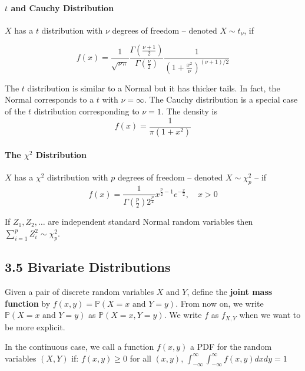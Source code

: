 \paragraph{\texorpdfstring{\(t\) and Cauchy Distribution}{t and Cauchy Distribution}}\label{t-and-cauchy-distribution}

\(X\) has a \(t\) distribution with \(\nu\) degrees of freedom -- denoted \(X \sim t_\nu\), if

\[
f(x) = \frac{1}{\sqrt{\nu \pi}} \frac{\Gamma\left( \frac{\nu + 1}{2} \right)}{\Gamma\left( \frac{\nu}{2} \right)} \frac{1}{\left(1 + \frac{x^{2}}{\nu} \right)^{(\nu + 1) / 2}} 
\]

The \(t\) distribution is similar to a Normal but it has thicker tails. In fact, the Normal corresponds to a \(t\) with \(\nu = \infty\). The Cauchy distribution is a special case of the \(t\) distribution corresponding to \(\nu = 1\). The density is
\[
f(x) = \frac{1}{\pi (1 + x^{2})}
\]

\paragraph{\texorpdfstring{The \(\chi^{2}\) Distribution}{The \textbackslash chi^{2} Distribution}}\label{chi2:dist}

\(X\) has a \(\chi^{2}\) distribution with \(p\) degrees of freedom -- denoted \(X \sim \chi_{p}^{2}\) -- if
\[ 
f(x) = \frac{1}{\Gamma\left(\frac{p}{2}\right) 2^{\frac{p}{2}}} x^{\frac{p}{2} - 1} e^{-\frac{x}{2}}, \quad x > 0 
\]

If \(Z_{1}, Z_{2}, \dots\) are independent standard Normal random variables then \(\sum_{i=1}^p Z_{i}^{2} \sim \chi_{p}^{2}\).

\subsection*{3.5 Bivariate Distributions}\label{bivariate-distributions}

Given a pair of discrete random variables \(X\) and \(Y\), define the \textbf{joint mass function} by \(f(x, y) = \mathbb{P}(X = x \text{ and } Y = y)\). From now on, we write \(\mathbb{P}(X = x \text{ and } Y = y)\) as \(\mathbb{P}(X = x, Y = y)\). We write \(f\) as \(f_{X, Y}\) when we want to be more explicit.

In the continuous case, we call a function \(f(x, y)\) a PDF for the random variables \((X, Y)\) if:  \(f(x, y) \geq 0\) for all \((x, y)\), \( \int_{-\infty}^{\infty}\int_{-\infty}^{\infty} f(x, y) dx dy = 1\) 

